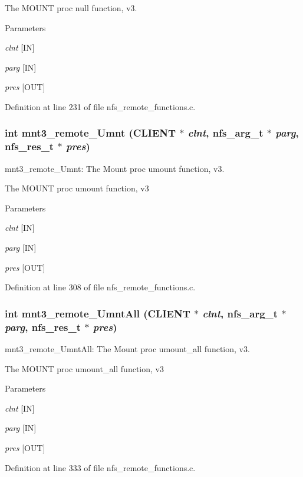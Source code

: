 The MOUNT proc null function, v3.


\begin{DoxyParams}{Parameters}
\item[{\em clnt}][IN] \item[{\em parg}][IN] \item[{\em pres}][OUT] \end{DoxyParams}


Definition at line 231 of file nfs\_\-remote\_\-functions.c.
\subsubsection[{mnt3\_\-remote\_\-Umnt}]{\setlength{\rightskip}{0pt plus 5cm}int mnt3\_\-remote\_\-Umnt (CLIENT $\ast$ {\em clnt}, \/  nfs\_\-arg\_\-t $\ast$ {\em parg}, \/  nfs\_\-res\_\-t $\ast$ {\em pres})}\label{group__MNTprocs_ga0eb4ed1fa7c89a3d21b91325082706a9}
mnt3\_\-remote\_\-Umnt: The Mount proc umount function, v3.

The MOUNT proc umount function, v3


\begin{DoxyParams}{Parameters}
\item[{\em clnt}][IN] \item[{\em parg}][IN] \item[{\em pres}][OUT] \end{DoxyParams}


Definition at line 308 of file nfs\_\-remote\_\-functions.c.
\subsubsection[{mnt3\_\-remote\_\-UmntAll}]{\setlength{\rightskip}{0pt plus 5cm}int mnt3\_\-remote\_\-UmntAll (CLIENT $\ast$ {\em clnt}, \/  nfs\_\-arg\_\-t $\ast$ {\em parg}, \/  nfs\_\-res\_\-t $\ast$ {\em pres})}\label{group__MNTprocs_ga72108294349dc32d7ae07d0d88e4d154}
mnt3\_\-remote\_\-UmntAll: The Mount proc umount\_\-all function, v3.

The MOUNT proc umount\_\-all function, v3


\begin{DoxyParams}{Parameters}
\item[{\em clnt}][IN] \item[{\em parg}][IN] \item[{\em pres}][OUT] \end{DoxyParams}


Definition at line 333 of file nfs\_\-remote\_\-functions.c.